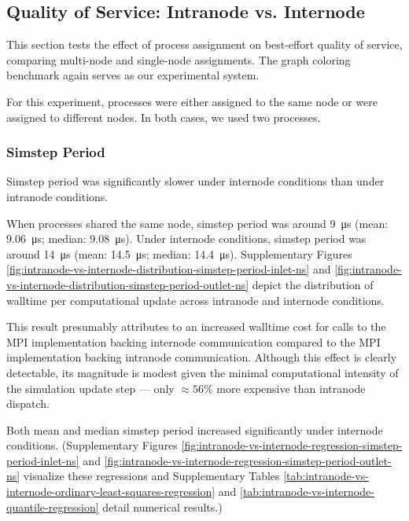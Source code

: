 \subsection{Quality of Service: Intranode vs. Internode}
\label{sec:intranode-vs-internode}

This section tests the effect of process assignment on best-effort quality of service, comparing multi-node and single-node assignments.
The graph coloring benchmark again serves as our experimental system.

For this experiment, processes were either assigned to the same node or were assigned to different nodes.
In both cases, we used two processes.

\subsubsection{Simstep Period}

Simstep period was significantly slower under internode conditions than under intranode conditions.

When processes shared the same node, simstep period was around \SI{9}{\micro\second} (mean: \SI{9.06}{\micro\second}; median: \SI{9.08}{\micro\second}).
Under internode conditions, simstep period was around \SI{14}{\micro\second} (mean: \SI{14.5}{\micro\second}; median: \SI{14.4}{\micro\second}).
Supplementary Figures \ref{fig:intranode-vs-internode-distribution-simstep-period-inlet-ns} and \ref{fig:intranode-vs-internode-distribution-simstep-period-outlet-ns} depict the distribution of walltime per computational update across intranode and internode conditions.

This result presumably attributes to an increased walltime cost for calls to the MPI implementation backing internode communication compared to the MPI implementation backing intranode communication.
Although this effect is clearly detectable, its magnitude is modest given the minimal computational intensity of the simulation update step --- only $\approx 56\%$ more expensive than intranode dispatch.

Both mean and median simstep period increased significantly under internode conditions.
(Supplementary Figures \ref{fig:intranode-vs-internode-regression-simstep-period-inlet-ns} and \ref{fig:intranode-vs-internode-regression-simstep-period-outlet-ns} visualize these regressions and Supplementary Tables \ref{tab:intranode-vs-internode-ordinary-least-squares-regression} and \ref{tab:intranode-vs-internode-quantile-regression} detail numerical results.)

